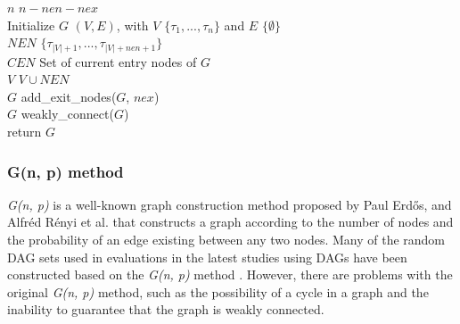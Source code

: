 \begin{algorithm}[t]
    {\footnotesize
        $n$ \la $n - nen - nex$ \\
        Initialize $G$ \la $(V, E)$, with $V$ \la $\{\tau_1, ..., \tau_{n}\}$ and $E$ \la $\{\emptyset\}$ \\
        $NEN$ \la $\{\tau_{|V|+1}, ..., \tau_{|V|+nen+1}\}$ \\
        $CEN$ \la Set of current entry nodes of $G$ \\
        $V$ \la $V \cup NEN$ \\
        $G$ \la add\_exit\_nodes($G$, $nex$) \\
        $G$ \la weakly\_connect($G$) \\
        return $G$
        \caption{{\it G(n, p)} method in RD-Gen}
        \label{alg: g_n_p}
    }
\end{algorithm}


\subsubsection{G(n, p) method}
\label{sssec: g_n_p}

{\it G(n, p)} is a well-known graph construction method proposed by Paul Erd{\H{o}}s, and Alfr{\'e}d R{\'e}nyi et al. \cite{cordeiro2010random} that constructs a graph according to the number of nodes and the probability of an edge existing between any two nodes.
Many of the random DAG sets used in evaluations in the latest studies using DAGs have been constructed based on the {\it G(n, p)} method \cite{voronov2021ai, he2021response, guo2019energy, dong2019efficient}.
However, there are problems with the original {\it G(n, p)} method, such as the possibility of a cycle in a graph and the inability to guarantee that the graph is weakly connected.

